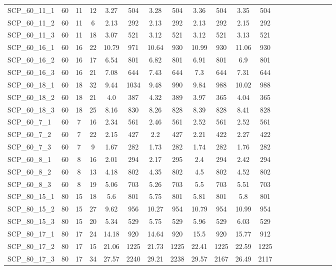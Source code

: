 \begin{sidewaystable}[!ht]
{\begin{tabular}{lccccccccccccccccccc}
SCP\_60\_11\_1 & 60 & 11 & 12 & 3.27 & 504 & 3.28 & 504 & 3.36 & 504 & 3.35 & 504 \\
SCP\_60\_11\_2 & 60 & 11 & 6 & 2.13 & 292 & 2.13 & 292 & 2.13 & 292 & 2.15 & 292 \\
SCP\_60\_11\_3 & 60 & 11 & 18 & 3.07 & 521 & 3.12 & 521 & 3.12 & 521 & 3.13 & 521 \\
SCP\_60\_16\_1 & 60 & 16 & 22 & 10.79 & 971 & 10.64 & 930 & 10.99 & 930 & 11.06 & 930 \\
SCP\_60\_16\_2 & 60 & 16 & 17 & 6.54 & 801 & 6.82 & 801 & 6.91 & 801 & 6.9 & 801 \\
SCP\_60\_16\_3 & 60 & 16 & 21 & 7.08 & 644 & 7.43 & 644 & 7.3 & 644 & 7.31 & 644 \\
SCP\_60\_18\_1 & 60 & 18 & 32 & 9.44 & 1034 & 9.48 & 990 & 9.84 & 988 & 10.02 & 988 \\
SCP\_60\_18\_2 & 60 & 18 & 21 & 4.0 & 387 & 4.32 & 389 & 3.97 & 365 & 4.04 & 365 \\
SCP\_60\_18\_3 & 60 & 18 & 25 & 8.16 & 830 & 8.26 & 828 & 8.39 & 828 & 8.41 & 828 \\
SCP\_60\_7\_1 & 60 & 7 & 16 & 2.34 & 561 & 2.46 & 561 & 2.52 & 561 & 2.52 & 561 \\
SCP\_60\_7\_2 & 60 & 7 & 22 & 2.15 & 427 & 2.2 & 427 & 2.21 & 422 & 2.27 & 422 \\
SCP\_60\_7\_3 & 60 & 7 & 9 & 1.67 & 282 & 1.73 & 282 & 1.74 & 282 & 1.76 & 282 \\
SCP\_60\_8\_1 & 60 & 8 & 16 & 2.01 & 294 & 2.17 & 295 & 2.4 & 294 & 2.42 & 294 \\
SCP\_60\_8\_2 & 60 & 8 & 13 & 4.18 & 802 & 4.35 & 802 & 4.5 & 802 & 4.52 & 802 \\
SCP\_60\_8\_3 & 60 & 8 & 19 & 5.06 & 703 & 5.26 & 703 & 5.5 & 703 & 5.51 & 703 \\
SCP\_80\_15\_1 & 80 & 15 & 18 & 5.6 & 801 & 5.75 & 801 & 5.81 & 801 & 5.8 & 801 \\
SCP\_80\_15\_2 & 80 & 15 & 27 & 9.62 & 956 & 10.27 & 954 & 10.79 & 954 & 10.99 & 954 \\
SCP\_80\_15\_3 & 80 & 15 & 20 & 5.34 & 529 & 5.75 & 529 & 5.96 & 529 & 6.03 & 529 \\
SCP\_80\_17\_1 & 80 & 17 & 24 & 14.18 & 920 & 14.64 & 920 & 15.5 & 920 & 15.77 & 912 \\
SCP\_80\_17\_2 & 80 & 17 & 15 & 21.06 & 1225 & 21.73 & 1225 & 22.41 & 1225 & 22.59 & 1225 \\
SCP\_80\_17\_3 & 80 & 17 & 34 & 27.57 & 2240 & 29.21 & 2238 & 29.57 & 2167 & 26.49 & 2117 \\

\end{tabular}}
\end{sidewaystable}
